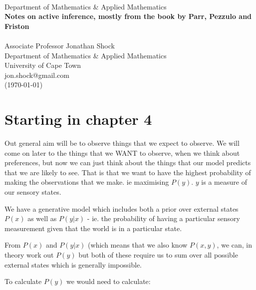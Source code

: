 \documentclass[11pt,oneside]{memoir}
\begin{document}

\thispagestyle{empty}

\begin{center}
\sffamily
\ \\[2cm]
{\LARGE Department of Mathematics \& Applied Mathematics}\\[1cm]
{\bfseries\Huge Notes on active inference, mostly from the book by Parr, Pezzulo and Friston}\\[6cm]
\leavevmode
\setlength{\epsfxsize}{4cm}
\\[1cm]
\Large
Associate Professor Jonathan Shock\\
Department of Mathematics \& Applied Mathematics \\
University of Cape Town \\
jon.shock@gmail.com\\
[1cm]


(\today)
\end{center}




\setcounter{page}{1}


\pagestyle{ruled}
\newpage 
\tableofcontents        %
\newpage

\chapter{Starting in chapter 4}
Out general aim will be to observe things that we expect to observe. We will come on later to the things that we WANT to observe, when we think about preferences, but now we can just think about the things that our model predicts that we are likely to see. That is that we want to have the highest probability of making the observations that we make. ie maximising $P(y)$. $y$ is a measure of our sensory states.

We have a generative model which includes both a prior over external states $P(x)$ as well as $P(y|x)$ - ie. the probability of having a particular sensory measurement given that the world is in a particular state.

From $P(x)$ and $P(y|x)$ (which means that we also know $P(x,y)$, we can, in theory work out $P(y)$  but both of these require us to sum over all possible external states which is generally impossible.

To calculate $P(y)$ we would need to calculate:
\end{document}
